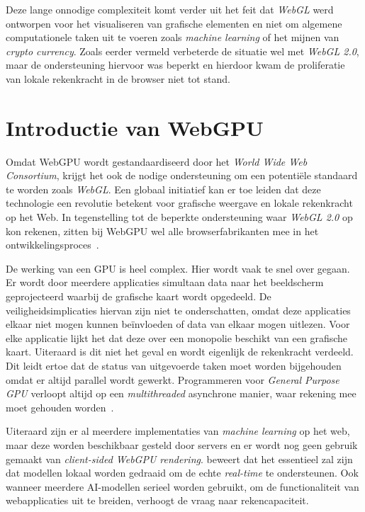 \bigbreak{}

Deze lange onnodige complexiteit komt verder uit het feit dat \textit{WebGL} werd ontworpen voor het visualiseren van grafische elementen en niet om algemene computationele taken uit te voeren zoals \textit{machine learning} of het mijnen van \textit{crypto currency}. Zoals eerder vermeld verbeterde de situatie wel met \textit{WebGL 2.0}, maar de ondersteuning hiervoor was beperkt en hierdoor kwam de proliferatie van lokale rekenkracht in de browser niet tot stand.

\break{}

\section{Introductie van WebGPU}
\label{sec:IntroWebGPU}

Omdat WebGPU wordt gestandaardiseerd door het \textit{World Wide Web Consortium}, krijgt het ook de nodige ondersteuning om een potentiële standaard te worden zoals \textit{WebGL}. Een globaal initiatief kan er toe leiden dat deze technologie een revolutie betekent voor grafische weergave en lokale rekenkracht op het Web. In tegenstelling tot de beperkte ondersteuning waar \textit{WebGL 2.0} op kon rekenen, zitten bij WebGPU wel alle browserfabrikanten mee in het ontwikkelingsproces~\autocite{Surma2022}.

\bigbreak{}

De werking van een GPU is heel complex. Hier wordt vaak te snel over gegaan. Er wordt door meerdere applicaties simultaan data naar het beeldscherm geprojecteerd waarbij de grafische kaart wordt opgedeeld. De veiligheidsimplicaties hiervan zijn niet te onderschatten, omdat deze applicaties elkaar niet mogen kunnen beïnvloeden of data van elkaar mogen uitlezen. Voor elke applicatie lijkt het dat deze over een monopolie beschikt van een grafische kaart. Uiteraard is dit niet het geval en wordt eigenlijk de rekenkracht verdeeld. Dit leidt ertoe dat de status van uitgevoerde taken moet worden bijgehouden omdat er altijd parallel wordt gewerkt. Programmeren voor \textit{General Purpose GPU} verloopt altijd op een \textit{multithreaded} asynchrone manier, waar rekening mee moet gehouden worden~\autocite{Surma2022}.

\bigbreak{}

Uiteraard zijn er al meerdere implementaties van \textit{machine learning} op het web, maar deze worden beschikbaar gesteld door servers en er wordt nog geen gebruik gemaakt van \textit{client-sided WebGPU rendering}. \textcite{Fleetwood2023a} beweert dat het essentieel zal zijn dat modellen lokaal worden gedraaid om de echte \textit{real-time} te ondersteunen. Ook wanneer meerdere AI-modellen serieel worden gebruikt, om de functionaliteit van webapplicaties uit te breiden, verhoogt de vraag naar rekencapaciteit.

